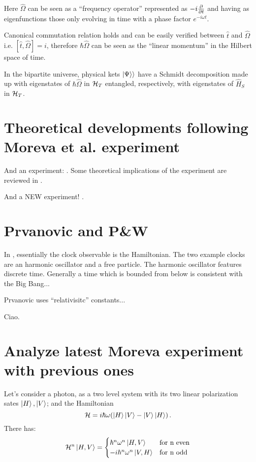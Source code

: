 Here $\hat{\Omega}$ can be seen as a ``frequency operator''
represented as $-i\pdv{t}$ and having as eigenfunctions
those only evolving in time with a phase factor $e^{-i \omega t}$.

Canonical commutation relation holds and can be easily verified
between $\hat{t}$ and $\hat{\Omega}$
i.e. $[\hat{t}, \hat{\Omega}] = i$,
therefore $\hbar\hat{\Omega}$ can be seen as the ``linear momentum''
in the Hilbert space of time.

In the bipartite universe, physical kets $|\Psi\rangle\rangle$ have a Schmidt decomposition
made up
with
eigenstates of $\hbar\hat{\Omega}$ in $\mathcal{H}_T$
entangled, respectively, with
eigenstates of $\hat{H}_S$ in $\mathcal{H}_T$.

\section{Theoretical developments following Moreva et al. experiment}

And an experiment: \cite{Moreva:synthetic,Moreva:illustration}.
Some theoretical implications of the experiment are reviewed in
\cite{LeggettGarg+PageWootters}.

And a NEW experiment! \parencite{Moreva_position}.


\iftodo

\section{Prvanovic and P\&W}
In \cite{Prvanovic}, essentially the clock observable is the Hamiltonian.
The two example clocks are an harmonic oscillator and a free particle.
The harmonic oscillator features discrete time. Generally a time which is
{bounded from below}
is consistent with the Big Bang...

Prvanovic uses ``relativisitc'' constants...

Ciao.

\section{Analyze latest Moreva experiment with previous ones}

Let's consider a photon, as a two level system with its two linear polarization
sates $\ket{H}, \ket{V}$;
and the Hamiltonian
\begin{equation}
  \mathcal{H}=i\hbar\omega\qty(\ket{H}\ket{V}-\ket{V}\ket{H})\,\text{.}
\end{equation}
There has:
\[
  \mathcal{H}^n \ket{H, V} = \begin{cases}
      \hbar^n\omega^n\ket{H, V} &\text{for n even} \\
    -i\hbar^n\omega^n\ket{V, H} &\text{for n odd}
  \end{cases}
\]


